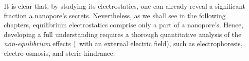 It is clear that, by studying its electrostatics, one can already reveal a significant fraction a nanopore's
secrets. Nevertheless, as we shall see in the following chapters, equilibrium electrostatics comprise only a
part of a nanopore's. Hence, developing a full understanding requires a thorough quantitative analysis of the
\emph{non-equilibrium} effects (\ie~with an external electric field), such as electrophoresis,
electro-osmosis, and steric hindrance.



\cleardoublepage


